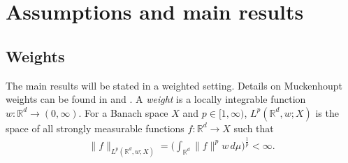 \documentclass{amsart}
\theoremstyle{plain}
\theoremstyle{remark}
\theoremstyle{plain}
\numberwithin{equation}{section}
\begin{document}
\section{Assumptions and main results}\label{sec:preliminaries}

\subsection{Weights}
The main results will be stated in a weighted setting.
Details on Muckenhoupt weights can be found in \cite[Chapter 9]{GrafakosModern} and \cite[Chapter V]{SteinHA}.
A {\em weight} is a locally integrable function $w:{ \mathbb{R} }^d\to (0,\infty)$.
For a Banach space $X$ and $p\in [1, \infty)$, $L^p({ \mathbb{R} }^d,w;X)$ is the space of
all strongly measurable functions $f:{ \mathbb{R} }^d\to X$ such that
\begin{align*}
\|f\|_{L^p({ \mathbb{R} }^d,w;X)}=\Big(\int_{{ \mathbb{R} }^d} \|f\|^p w \, d\mu\Big)^\frac{1}{p}<\infty.
\end{align*}
\end{document}
